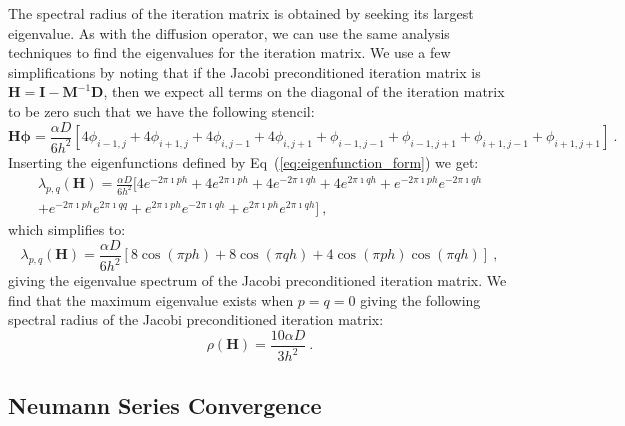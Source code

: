 \documentclass[preprint,11pt]{elsarticle}
\newcommand{\ve}[1]{\ensuremath{\mathbf{#1}}}
\begin{document}
The spectral radius of the iteration matrix is obtained by seeking its largest
eigenvalue. As with the diffusion operator, we can use the same analysis
techniques to find the eigenvalues for the iteration matrix. We use a few
simplifications by noting that if the Jacobi preconditioned iteration matrix
is $\ve{H} = \ve{I} - \ve{M}^{-1}\ve{D}$, then we expect all terms on the
diagonal of the iteration matrix to be zero such that we have the following
stencil:
\begin{equation}
  \ve{H}\boldsymbol{\phi} = \frac{\alpha D}{6h^2}[4 \phi_{i-1,j}
    + 4 \phi_{i+1,j} + 4 \phi_{i,j-1} + 4 \phi_{i,j+1} +
    \phi_{i-1,j-1} + \phi_{i-1,j+1} + \phi_{i+1,j-1} +
    \phi_{i+1,j+1}]\:.
  \label{eq:iteration_stencil}
\end{equation}
Inserting the eigenfunctions defined by Eq~(\ref{eq:eigenfunction_form}) we
get:
\begin{multline}
  \lambda_{p,q}(\ve{H}) = \frac{\alpha D}{6h^2}\Big[4 e^{-2 \pi \imath p
      h} + 4 e^{2 \pi \imath p h} + 4 e^{-2 \pi \imath q h} + 4 e^{2
      \pi \imath q h} + e^{-2 \pi \imath p h} e^{-2 \pi \imath q h}
    \\ + e^{-2 \pi \imath p h} e^{2 \pi \imath q q} + e^{2 \pi \imath
      p h} e^{-2 \pi \imath q h} + e^{2 \pi \imath p h} e^{2 \pi
      \imath q h}\Big]\:,
  \label{eq:iteration_deriv}
\end{multline}
which simplifies to:
\begin{equation}
  \lambda_{p,q}(\ve{H}) = \frac{\alpha D}{6h^2}[ 8 \cos(\pi p h) + 8
    \cos(\pi q h) + 4 \cos(\pi p h) \cos(\pi q h)]\:,
  \label{eq:iteration_spectrum}
\end{equation}
giving the eigenvalue spectrum of the Jacobi preconditioned iteration
matrix. We find that the maximum eigenvalue exists when $p=q=0$ giving the
following spectral radius of the Jacobi preconditioned iteration matrix:
\begin{equation}
  \rho(\ve{H}) = \frac{10 \alpha D}{3 h^2}\:.
  \label{eq:iteration_radius}
\end{equation}

\subsection{Neumann Series Convergence}
\label{subsec:neumann_convergence}
\end{document}
